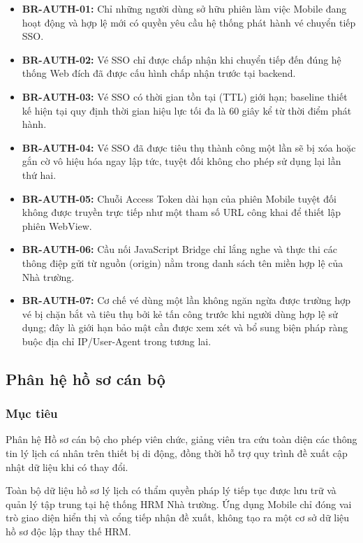 \begin{itemize}[leftmargin=1.5cm]
    \item \textbf{BR-AUTH-01:} Chỉ những người dùng sở hữu phiên làm việc Mobile đang hoạt động và hợp lệ mới có quyền yêu cầu hệ thống phát hành vé chuyển tiếp SSO.
    \item \textbf{BR-AUTH-02:} Vé SSO chỉ được chấp nhận khi chuyển tiếp đến đúng hệ thống Web đích đã được cấu hình chấp nhận trước tại backend.
    \item \textbf{BR-AUTH-03:} Vé SSO có thời gian tồn tại (TTL) giới hạn; baseline thiết kế hiện tại quy định thời gian hiệu lực tối đa là 60 giây kể từ thời điểm phát hành.
    \item \textbf{BR-AUTH-04:} Vé SSO đã được tiêu thụ thành công một lần sẽ bị xóa hoặc gắn cờ vô hiệu hóa ngay lập tức, tuyệt đối không cho phép sử dụng lại lần thứ hai.
    \item \textbf{BR-AUTH-05:} Chuỗi Access Token dài hạn của phiên Mobile tuyệt đối không được truyền trực tiếp như một tham số URL công khai để thiết lập phiên WebView.
    \item \textbf{BR-AUTH-06:} Cầu nối JavaScript Bridge chỉ lắng nghe và thực thi các thông điệp gửi từ nguồn (origin) nằm trong danh sách tên miền hợp lệ của Nhà trường.
    \item \textbf{BR-AUTH-07:} Cơ chế vé dùng một lần không ngăn ngừa được trường hợp vé bị chặn bắt và tiêu thụ bởi kẻ tấn công trước khi người dùng hợp lệ sử dụng; đây là giới hạn bảo mật cần được xem xét và bổ sung biện pháp ràng buộc địa chỉ IP/User-Agent trong tương lai.
\end{itemize}

\subsection{Phân hệ hồ sơ cán bộ}
\label{subsec:req_profile}

\subsubsection{Mục tiêu}
Phân hệ Hồ sơ cán bộ cho phép viên chức, giảng viên tra cứu toàn diện các thông tin lý lịch cá nhân trên thiết bị di động, đồng thời hỗ trợ quy trình đề xuất cập nhật dữ liệu khi có thay đổi.

Toàn bộ dữ liệu hồ sơ lý lịch có thẩm quyền pháp lý tiếp tục được lưu trữ và quản lý tập trung tại hệ thống HRM Nhà trường. Ứng dụng Mobile chỉ đóng vai trò giao diện hiển thị và cổng tiếp nhận đề xuất, không tạo ra một cơ sở dữ liệu hồ sơ độc lập thay thế HRM.

